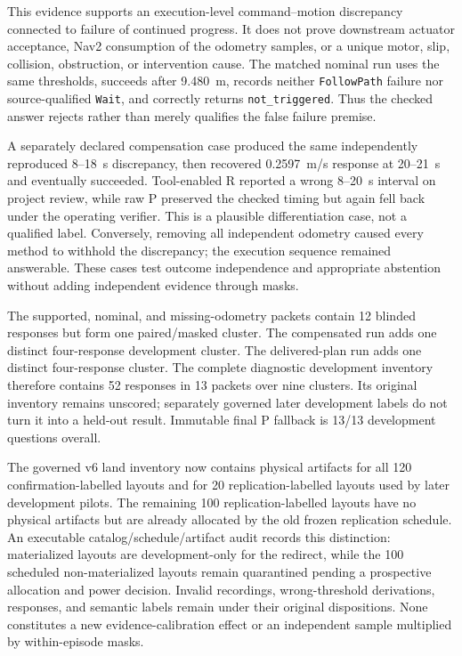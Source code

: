 \documentclass[conference]{IEEEtran}
\begin{document}
This evidence supports an execution-level command--motion discrepancy connected to failure of
continued progress. It does not prove downstream actuator acceptance, Nav2 consumption of the
odometry samples, or a unique motor, slip, collision, obstruction, or intervention cause. The
matched nominal run uses the same thresholds, succeeds after 9.480~m, records neither
\texttt{FollowPath} failure nor source-qualified \texttt{Wait}, and correctly returns
\texttt{not\_triggered}. Thus the checked answer rejects rather than merely qualifies the false
failure premise.

A separately declared compensation case produced the same independently reproduced 8--18~s
discrepancy, then recovered 0.2597~m/s response at 20--21~s and eventually succeeded. Tool-enabled R
reported a wrong 8--20~s interval on project review, while raw P preserved the checked timing but
again fell back under the operating verifier. This is a plausible differentiation case, not a
qualified label. Conversely, removing all independent odometry caused every method to withhold the
discrepancy; the execution sequence remained answerable. These cases test outcome independence and
appropriate abstention without adding independent evidence through masks.

The supported, nominal, and missing-odometry packets contain 12 blinded responses but form one
paired/masked cluster. The compensated run adds one distinct four-response development cluster.
The delivered-plan run adds one distinct four-response cluster. The complete diagnostic development
inventory therefore contains 52 responses in 13 packets over nine clusters. Its original inventory
remains unscored; separately governed later development labels do not turn it into a held-out
result. Immutable final P fallback is 13/13 development questions overall.

The governed v6 land inventory now contains physical artifacts for all 120
confirmation-labelled layouts and for 20 replication-labelled layouts used by later development
pilots. The remaining 100 replication-labelled layouts have no physical artifacts but are already
allocated by the old frozen replication schedule. An executable catalog/schedule/artifact audit
records this distinction: materialized layouts are development-only for the redirect, while the
100 scheduled non-materialized layouts remain quarantined pending a prospective allocation and
power decision. Invalid recordings, wrong-threshold derivations, responses, and semantic labels
remain under their original dispositions. None constitutes a new evidence-calibration effect or
an independent sample multiplied by within-episode masks.
\end{document}
